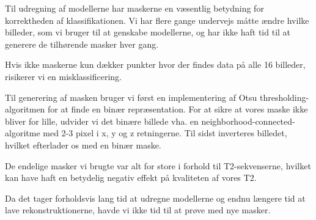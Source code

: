 Til udregning af modellerne har maskerne en væsentlig betydning for korrektheden af klassifikationen. Vi har flere gange undervejs måtte ændre hvilke billeder, som vi bruger til at genskabe modellerne, og har ikke haft tid til at generere de tilhørende masker hver gang.

Hvis ikke maskerne kun dækker punkter hvor der findes data på alle 16 billeder, risikerer vi en misklassificering. 

Til generering af masken bruger vi først en implementering af Otsu
thresholding-algoritmen for at finde en binær repræsentation. For at
sikre at vores maske ikke bliver for lille, udvider vi det binære billede
vha. en neighborhood-connected-algoritme med 2-3 pixel i x, y og z
retningerne. Til sidst inverteres billedet, hvilket efterlader os med en
binær maske.

De endelige masker vi brugte var alt for store i forhold til T2-sekvenserne, hvilket kan have haft en betydelig negativ effekt på kvaliteten af vores T2.

Da det tager forholdsvis lang tid at udregne modellerne og endnu længere tid at lave rekonstruktionerne, havde vi ikke tid til at prøve med nye masker.

